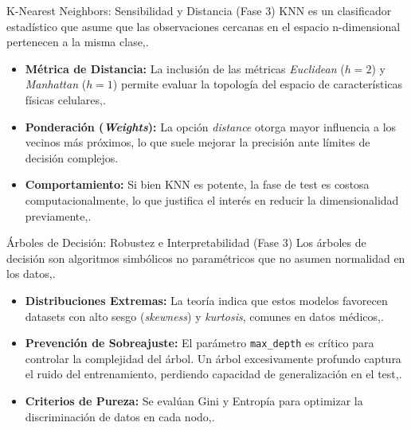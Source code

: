 \documentclass{beamer}
\begin{document}
	\begin{frame}{K-Nearest Neighbors: Sensibilidad y Distancia (Fase 3)}
		KNN es un clasificador estadístico que asume que las observaciones cercanas en el espacio n-dimensional pertenecen a la misma clase,.
		
		\begin{itemize}
			\item<2-> \textbf{Métrica de Distancia:} La inclusión de las métricas \textit{Euclidean} ($h=2$) y \textit{Manhattan} ($h=1$) permite evaluar la topología del espacio de características físicas celulares,.
			\item<3-> \textbf{Ponderación (\textit{Weights}):} La opción \textit{distance} otorga mayor influencia a los vecinos más próximos, lo que suele mejorar la precisión ante límites de decisión complejos.
			\item<4-> \textbf{Comportamiento:} Si bien KNN es potente, la fase de test es costosa computacionalmente, lo que justifica el interés en reducir la dimensionalidad previamente,.
		\end{itemize}
	\end{frame}
	
	\begin{frame}{Árboles de Decisión: Robustez e Interpretabilidad (Fase 3)}
		Los árboles de decisión son algoritmos simbólicos no paramétricos que no asumen normalidad en los datos,.
		
		\begin{itemize}
			\item<2-> \textbf{Distribuciones Extremas:} La teoría indica que estos modelos favorecen datasets con alto sesgo (\textit{skewness}) y \textit{kurtosis}, comunes en datos médicos,.
			\item<3-> \textbf{Prevención de Sobreajuste:} El parámetro \texttt{max\_depth} es crítico para controlar la complejidad del árbol. Un árbol excesivamente profundo captura el ruido del entrenamiento, perdiendo capacidad de generalización en el test,.
			\item<4-> \textbf{Criterios de Pureza:} Se evalúan Gini y Entropía para optimizar la discriminación de datos en cada nodo,.
		\end{itemize}
	\end{frame}
	
\end{document}
